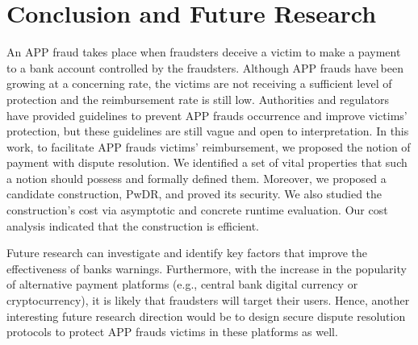 
 \vspace{-3mm}
\section{Conclusion and Future Research}\label{sec::conclusion}


An APP fraud takes place when fraudsters deceive a victim to make a payment to a bank account controlled by the fraudsters. Although APP frauds have been growing at a concerning rate, the  victims are not receiving a sufficient level of protection and the reimbursement rate is still low. Authorities and regulators have  provided guidelines  to prevent APP frauds occurrence and improve victims’ protection, but these guidelines are still vague and open to interpretation. In this work, to facilitate APP frauds victims’ reimbursement,  we proposed the notion of payment with dispute resolution. We identified a set of vital properties that such a notion  should possess and formally defined them. Moreover,  we proposed a candidate construction, PwDR, and proved its security.  We also  studied the construction's cost via asymptotic and concrete runtime evaluation. Our cost analysis indicated that the construction is efficient. 



Future research can investigate and identify key factors that  improve the effectiveness of banks warnings.  Furthermore, with the increase in the popularity of  alternative payment platforms (e.g., central bank digital currency or cryptocurrency), it is likely that  fraudsters will target their users. Hence, another interesting future research direction would be to design secure dispute resolution protocols  to protect  APP frauds victims in these platforms as well. 



